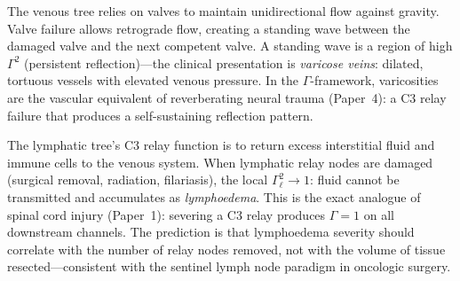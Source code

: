 \documentclass[aps,pre,twocolumn,superscriptaddress,floatfix]{revtex4-2}
\begin{document}
\begin{remark}
\label{rem:venous}
The venous tree relies on valves to maintain
unidirectional flow against gravity.
Valve failure allows retrograde flow, creating a
standing wave between the damaged valve and the next
competent valve.
A standing wave is a region of high $\Gamma^2$
(persistent reflection)---the clinical presentation
is \emph{varicose veins}: dilated, tortuous vessels
with elevated venous pressure.
In the $\Gamma$-framework, varicosities are the
vascular equivalent of reverberating neural trauma
(Paper~4): a C3 relay failure that produces a
self-sustaining reflection pattern.
\end{remark}

\begin{remark}
\label{rem:lymphoedema}
The lymphatic tree's C3 relay function is to return
excess interstitial fluid and immune cells to the
venous system.
When lymphatic relay nodes are damaged (surgical
removal, radiation, filariasis), the local
$\Gamma_{\ell}^2 \to 1$: fluid cannot be transmitted
and accumulates as \emph{lymphoedema}.
This is the exact analogue of spinal cord injury
(Paper~1): severing a C3 relay produces
$\Gamma = 1$ on all downstream channels.
The prediction is that lymphoedema severity should
correlate with the number of relay nodes removed,
not with the volume of tissue resected---consistent
with the sentinel lymph node paradigm in oncologic
surgery.
\end{remark}
\end{document}
